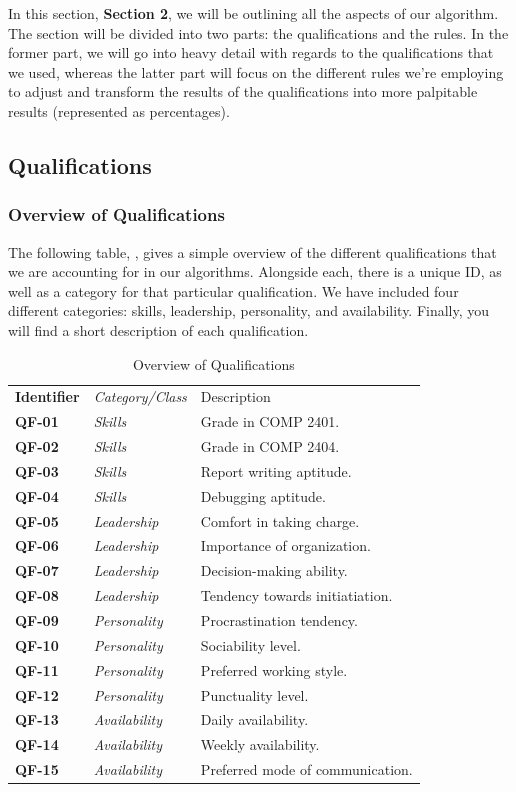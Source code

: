 \documentclass[12pt,letterpaper]{article}
\begin{document}
In this section, {\bf Section 2}, we will be outlining all the aspects of our algorithm. The section will be divided into two parts: the qualifications and the rules. In the former part, we will go into heavy detail with regards to the qualifications that we used, whereas the latter part will focus on the different rules we're employing to adjust and transform the results of the qualifications into more palpitable results (represented as percentages). 

\subsection{Qualifications}

\subsubsection{Overview of Qualifications}

The following table, , gives a simple overview of the different qualifications that we are accounting for in our algorithms. Alongside each, there is a unique ID, as well as a category for that particular qualification. We have included four different categories: skills, leadership, personality, and availability. Finally, you will find a short description of each qualification.

\begin{table}[H]
	\caption{Overview of Qualifications}
	\begin{tabu} to 
	    \tableheader{}Identifier & Category/Class & Description\\
		QF-01 & Skills & Grade in COMP 2401.\\
		QF-02 & Skills & Grade in COMP 2404.\\
		QF-03 & Skills & Report writing aptitude.\\
		QF-04 & Skills & Debugging aptitude.\\
		QF-05 & Leadership & Comfort in taking charge. \\
		QF-06 & Leadership & Importance of organization. \\
		QF-07 & Leadership & Decision-making ability. \\
		QF-08 & Leadership & Tendency towards initiatiation. \\
		QF-09 & Personality & Procrastination tendency. \\
		QF-10 & Personality & Sociability level. \\
		QF-11 & Personality & Preferred working style. \\
		QF-12 & Personality & Punctuality level. \\
		QF-13 & Availability & Daily availability. \\
		QF-14 & Availability & Weekly availability. \\
		QF-15 & Availability & Preferred mode of communication. \\
	\end{tabu}
\end{table}
\end{document}
